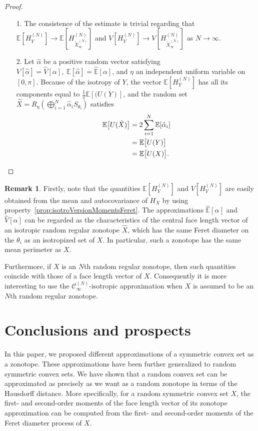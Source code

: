 \documentclass[numbers,compress,v1.0.1]{vmsta}
\theoremstyle{definition}
\newtheorem{remark}{Remark}
\begin{document}
\begin{proof}
$\:$
%
\begin{enumerate}
%
\item[1.] The consistence of the estimate is trivial regarding that $
\mathbb{E}[H_Y^{(N)}]\rightarrow\mathbb{E}[H_{\tilde{X}_\infty
^{(N)}}^{(N)}]$ and $ V[H_Y^{(N)}]\rightarrow V[H_{\tilde{X}_\infty
^{(N)}}^{(N)}]$
as $N\rightarrow\infty$.
%
\item[2.] Let $\hat{\alpha}$ be a positive random vector satisfying
$V[\hat{\alpha}]=\hat{V}[\alpha],\;\mathbb{E}[\hat{\alpha}]=\hat{\mathbb
{E}}[\alpha]$, and $\eta$ an independent uniform variable on $[0,\pi]$.
Because of the isotropy of $Y$, the vector $ \mathbb{E}[H^{(N)}_Y]$ has
all its components equal to $\frac{1}{\pi}\mathbb{E}[(U(Y)]$, and the
random set $\hat{X}=R_\eta(\bigoplus_{i=1}^N \hat{\alpha}_i S_{\theta
_i})$ satisfies
%
\begin{align*}
\mathbb{E}\bigl[U(\hat{X})\bigr]&=2\sum_{i=1}^N
\mathbb{E}[\hat{\alpha}_i]
\\
&=\mathbb{E}\bigl[U(Y)\bigr]
\\
&=\mathbb{E}\bigl[U(X)\bigr].\qedhere
\end{align*}
%
\end{enumerate}
%
\end{proof}

\begin{remark}
Firstly, note that the quantities $\mathbb{E}[H_Y^{(N)}]$ and
$V[H_Y^{(N)}]$ are easily obtained from the mean and autocovariance of
$H_X$ by using property~\ref{prop:isotroVersionMomentsFeret}.
The approximations $\hat{\mathbb{E}}[\alpha]$ and $\hat{V}[\alpha]$ can
be regarded as the characteristics of the central face length vector of
an isotropic random regular zonotope $\hat{X}$, which has the same
Feret diameter on the $\theta_i$ as an isotropized set of $X$. In
particular, such a zonotope has the same mean perimeter as $X$.

Furthermore, if $X$ is an $N$th random regular zonotope, then such
quantities coincide with those of a face length vector of $X$.
Consequently it is more interesting to use the $\mathcal{C}_\infty
^{(N)}$-isotropic approximation when $X$ is assumed to be an $N$th
random regular zonotope.
\end{remark}

\section{Conclusions and prospects}
In this paper, we proposed different approximations of a symmetric
convex set as a zonotope. These approximations have been further
generalized to random symmetric convex sets. We have shown that a
random convex set can be approximated as precisely as we want as a
random zonotope in terms of the Hausdorff distance.
More specifically, for a random symmetric convex set $X$, the first-
and second-order moments of the face length vector of its zonotope
approximation can be computed from the first- and second-order moments
of the Feret diameter process of $X$.
\end{document}
